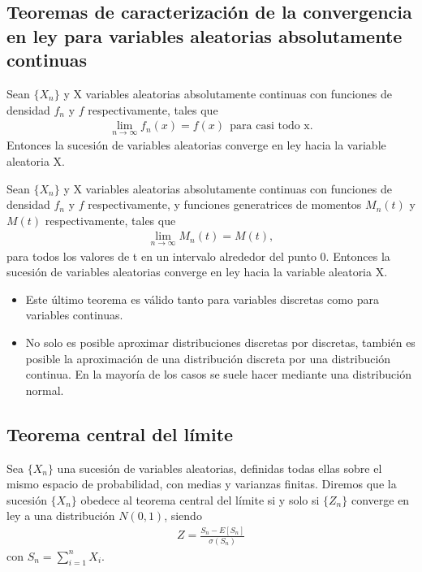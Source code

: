 \subsection{Teoremas de caracterización de la convergencia en ley para variables aleatorias absolutamente continuas}

\begin{teo}
Sean $\{X_n\}$ y X variables aleatorias absolutamente continuas con funciones de densidad $f_n$ y $f$ respectivamente, tales que 
\begin{align*}
    \lim_{n \to \infty}{f_n(x) = f(x)} \ \ \text{para casi todo x}.
\end{align*}
Entonces la sucesión de variables aleatorias converge en ley hacia la variable aleatoria X.
\end{teo}

\begin{teo}
Sean $\{X_n\}$ y X variables aleatorias absolutamente continuas con funciones de densidad $f_n$ y $f$ respectivamente, y funciones generatrices de momentos $M_n(t)$ y $M(t)$ respectivamente, tales que
\begin{align*}
    \lim_{n \to \infty}{M_n(t) = M(t)},
\end{align*}
para todos los valores de t en un intervalo alrededor del punto 0. Entonces la sucesión de variables aleatorias converge en ley hacia la variable aleatoria X.
\end{teo}

\begin{obs}
\begin{itemize}
    \item Este último teorema es válido tanto para variables discretas como para variables continuas.
    \item No solo es posible aproximar distribuciones discretas por discretas, también es posible la aproximación de una distribución discreta por una distribución continua. En la mayoría de los casos se suele hacer mediante una distribución normal.
\end{itemize}
\end{obs}

\subsection{Teorema central del límite}

\begin{defi}
Sea $\{X_n\}$ una sucesión de variables aleatorias, definidas todas ellas sobre el mismo espacio de probabilidad, con medias y varianzas finitas. Diremos que la sucesión $\{X_n\}$ obedece al teorema central del límite si y solo si $\{Z_n\}$ converge en ley a una distribución $N(0,1)$, siendo
\begin{align*}
    Z = \frac{S_n - E[S_n]}{\sigma(S_n)}
\end{align*}
con $S_n = \sum_{i=1}^{n}{X_i}$.
\end{defi}

